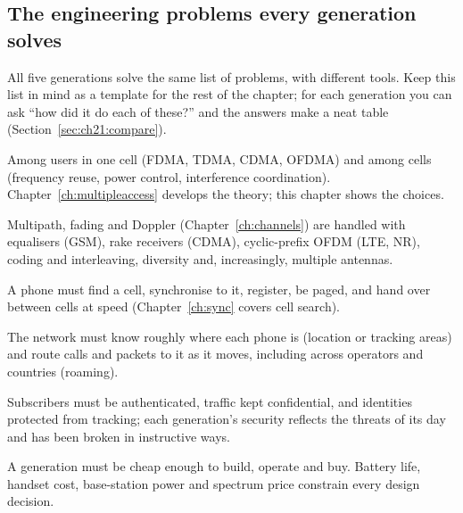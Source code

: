 \subsection{The engineering problems every generation solves}

All five generations solve the same list of problems, with different tools. Keep this list in mind
as a template for the rest of the chapter; for each generation you can ask ``how did it do
each of these?'' and the answers make a neat table (Section~\ref{sec:ch21:compare}).
\begin{description}[style=nextline,leftmargin=1.2em,font=\sffamily\bfseries\small\color{navy}]
\item[Sharing the spectrum.] Among users in one cell (FDMA, TDMA, CDMA, OFDMA) and among cells
(frequency reuse, power control, interference coordination). Chapter~\ref{ch:multipleaccess}
develops the theory; this chapter shows the choices.
\item[Beating the channel.] Multipath, fading and Doppler (Chapter~\ref{ch:channels}) are handled
with equalisers (GSM), rake receivers (CDMA), cyclic-prefix OFDM (LTE, NR), coding and
interleaving, diversity and, increasingly, multiple antennas.
\item[Finding and keeping the network.] A phone must find a cell, synchronise to it, register, be
paged, and hand over between cells at speed (Chapter~\ref{ch:sync} covers cell search).
\item[Mobility management.] The network must know roughly where each phone is (location or tracking
areas) and route calls and packets to it as it moves, including across operators and countries
(roaming).
\item[Security.] Subscribers must be authenticated, traffic kept confidential, and identities
protected from tracking; each generation's security reflects the threats of its day and has been
broken in instructive ways.
\item[Economy.] A generation must be cheap enough to build, operate and buy. Battery life, handset
cost, base-station power and spectrum price constrain every design decision.
\end{description}


